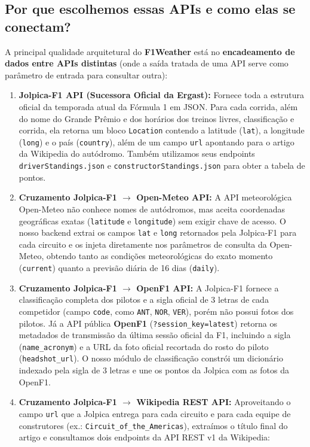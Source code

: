 \documentclass[12pt]{article}
\begin{document}
\subsection{Por que escolhemos essas APIs e como elas se conectam?}

A principal qualidade arquitetural do \textbf{F1Weather} está no \textbf{encadeamento de dados entre APIs distintas} (onde a saída tratada de uma API serve como parâmetro de entrada para consultar outra):

\begin{enumerate}
    \item \textbf{Jolpica-F1 API (Sucessora Oficial da Ergast):} Fornece toda a estrutura oficial da temporada atual da Fórmula 1 em JSON. Para cada corrida, além do nome do Grande Prêmio e dos horários dos treinos livres, classificação e corrida, ela retorna um bloco \texttt{Location} contendo a latitude (\texttt{lat}), a longitude (\texttt{long}) e o país (\texttt{country}), além de um campo \texttt{url} apontando para o artigo da Wikipedia do autódromo. Também utilizamos seus endpoints \texttt{driverStandings.json} e \texttt{constructorStandings.json} para obter a tabela de pontos.
    \item \textbf{Cruzamento Jolpica-F1 $\rightarrow$ Open-Meteo API:} A API meteorológica Open-Meteo não conhece nomes de autódromos, mas aceita coordenadas geográficas exatas (\texttt{latitude} e \texttt{longitude}) sem exigir chave de acesso. O nosso backend extrai os campos \texttt{lat} e \texttt{long} retornados pela Jolpica-F1 para cada circuito e os injeta diretamente nos parâmetros de consulta da Open-Meteo, obtendo tanto as condições meteorológicas do exato momento (\texttt{current}) quanto a previsão diária de 16 dias (\texttt{daily}).
    \item \textbf{Cruzamento Jolpica-F1 $\rightarrow$ OpenF1 API:} A Jolpica-F1 fornece a classificação completa dos pilotos e a sigla oficial de 3 letras de cada competidor (campo \texttt{code}, como \texttt{ANT}, \texttt{NOR}, \texttt{VER}), porém não possui fotos dos pilotos. Já a API pública \textbf{OpenF1} (\texttt{?session\_key=latest}) retorna os metadados de transmissão da última sessão oficial da F1, incluindo a sigla (\texttt{name\_acronym}) e a URL da foto oficial recortada do rosto do piloto (\texttt{headshot\_url}). O nosso módulo de classificação constrói um dicionário indexado pela sigla de 3 letras e une os pontos da Jolpica com as fotos da OpenF1.
    \item \textbf{Cruzamento Jolpica-F1 $\rightarrow$ Wikipedia REST API:} Aproveitando o campo \texttt{url} que a Jolpica entrega para cada circuito e para cada equipe de construtores (ex.: \texttt{Circuit\_of\_the\_Americas}), extraímos o título final do artigo e consultamos dois endpoints da API REST v1 da Wikipedia:

\end{enumerate}
\end{document}
